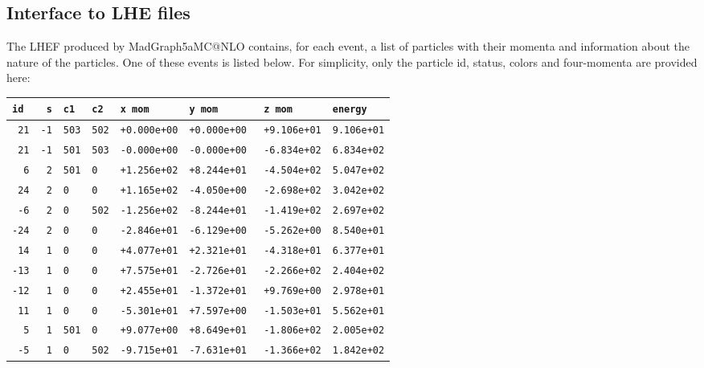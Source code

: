 \documentclass[11pt,a4paper]{article}
\begin{document}
\subsection{Interface to LHE files}\label{sec:app_setUpShower}
The LHEF produced by {\sc MadGraph5\Q{_}aMC@NLO} contains, for each event,  a list of particles with their momenta and information about the nature of the particles. One of these events is listed below. For simplicity, only  the particle id, status, colors and four-momenta are provided here:

\begin{center}
\begin{tabular}{rrllllll}
{\tt id } & {\tt s} & {\tt c1} & {\tt c2} & {\tt x mom } & {\tt y mom} & {\tt z mom} & {\tt energy}  \\
\hline
{\tt 21} & {\tt -1} & {\tt 503} & {\tt 502} & {\tt +0.000e+00} & {\tt +0.000e+00} & {\tt +9.106e+01} & {\tt 9.106e+01}  \\
{\tt 21} & {\tt -1} & {\tt 501} & {\tt 503} & {\tt -0.000e+00} & {\tt -0.000e+00} & {\tt -6.834e+02} & {\tt 6.834e+02}  \\
{\tt 6} & {\tt 2} & {\tt 501} & {\tt 0} & {\tt +1.256e+02} & {\tt+8.244e+01 } & {\tt -4.504e+02} & {\tt 5.047e+02}  \\
{\tt 24} & {\tt 2} & {\tt 0} & {\tt 0} & {\tt +1.165e+02} & {\tt -4.050e+00} & {\tt -2.698e+02} & {\tt 3.042e+02}  \\
{\tt -6} & {\tt 2} & {\tt 0} & {\tt 502} & {\tt -1.256e+02} & {\tt -8.244e+01} & {\tt -1.419e+02} & {\tt2.697e+02}  \\
{\tt -24} & {\tt 2} & {\tt 0} & {\tt 0} & {\tt -2.846e+01} & {\tt -6.129e+00} & {\tt -5.262e+00} & {\tt 8.540e+01}  \\
{\tt 14} & {\tt 1} & {\tt 0} & {\tt 0} & {\tt +4.077e+01} & {\tt +2.321e+01} & {\tt -4.318e+01} & {\tt 6.377e+01}  \\
{\tt -13} & {\tt 1} & {\tt 0} & {\tt 0} & {\tt +7.575e+01} & {\tt -2.726e+01} & {\tt -2.266e+02} & {\tt 2.404e+02}  \\
{\tt -12} & {\tt 1} & {\tt 0} & {\tt 0} & {\tt +2.455e+01} & {\tt -1.372e+01} & {\tt +9.769e+00} & {\tt 2.978e+01}  \\
{\tt 11} & {\tt 1} & {\tt 0} & {\tt 0} & {\tt -5.301e+01} & {\tt +7.597e+00} & {\tt -1.503e+01} & {\tt 5.562e+01}  \\
{\tt 5} & {\tt 1} & {\tt 501} & {\tt 0} & {\tt +9.077e+00} & {\tt +8.649e+01} & {\tt -1.806e+02} & {\tt 2.005e+02}  \\
{\tt -5} & {\tt 1} & {\tt 0} & {\tt 502} & {\tt -9.715e+01} & {\tt -7.631e+01} & {\tt -1.366e+02} & {\tt 1.842e+02}  
\end{tabular}
\end{center}
 
\end{document}
